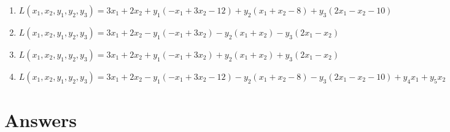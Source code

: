 \documentclass{article}%
\begin{document}
\begin{enumerate}
\begin{enumerate}
\item $L(x_1, x_2, y_1, y_2, y_3) = 3x_1 + 2x_2 + y_1(-x_1 + 3x_2 - 12) + y_2(x_1 + x_2 - 8) + y_3(2x_1 - x_2 - 10)$%
\item $L(x_1, x_2, y_1, y_2, y_3) = 3x_1 + 2x_2 - y_1(-x_1 + 3x_2) - y_2(x_1 + x_2) - y_3(2x_1 - x_2)$%
\item $L(x_1, x_2, y_1, y_2, y_3) = 3x_1 + 2x_2 + y_1(-x_1 + 3x_2) + y_2(x_1 + x_2) + y_3(2x_1 - x_2)$%
\item $L(x_1, x_2, y_1, y_2, y_3) = 3x_1 + 2x_2 - y_1(-x_1 + 3x_2 - 12) - y_2(x_1 + x_2 - 8) - y_3(2x_1 - x_2 - 10) + y_4x_1 + y_5x_2$%
\end{enumerate}%
\vspace{1em}%
\end{enumerate}

%
\newpage%
\section{Answers}%
\label{sec:Answers}%
\end{document}
